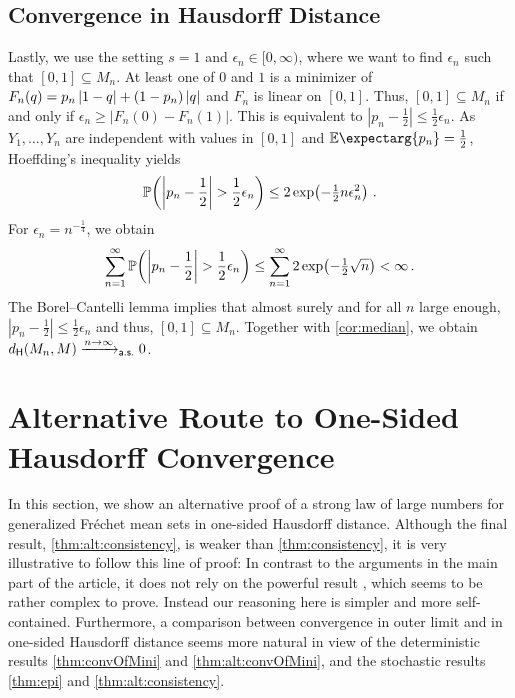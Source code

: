 \documentclass{scrartcl}
\renewcommand{\subset}{\subseteq}
\newcommand{\PrOf}[1]{\Pr\mathopen{}\lb #1 \rb\mathclose{}}
\newcommand{\Ex}{\E\expectarg}
\newcommand*{\ms}[1]{\mathsf{#1}}
\newcommand{\equationFullstop}{\, .}
\newcommand{\eqfs}{\equationFullstop}
\theoremstyle{plain}\newtheorem{theorem}{Theorem}[section]
\theoremstyle{definition}
\theoremstyle{remark}
\begin{document}
\begin{appendix}
\subsection{Convergence in Hausdorff Distance}
Lastly, we use the setting $s=1$ and $\epsilon_n\in[0,\infty)$, where we want to find $\epsilon_n$ such that $[0,1] \subset M_n$.
At least one of $0$ and $1$ is a minimizer of $F_n(q)=p_n\left| 1-q \right|+(1-p_n)\left| q \right|$ and $F_n$ is linear on $[0,1]$. Thus, $[0,1] \subset M_n$ if and only if  $\epsilon_n \geq |F_n(0)-F_n(1)|$. This is equivalent to
 $|p_n-\frac12| \leq \frac12\epsilon_n$.
As $Y_1,\dots, Y_n$ are independent with values in $[0,1]$ and $\Ex{p_n} = \frac12$, Hoeffding's inequality \cite[Theorem 2]{hoeffding63} yields
\begin{equation*}
	\PrOf{\abs{p_n-\frac12} > \frac12\epsilon_n} \leq 2 \exp\brOf{-\tfrac12 n \epsilon_n^2}
	\eqfs
\end{equation*}
For $\epsilon_n = n^{-\frac14}$, we obtain
\begin{equation*}
	\sum_{n=1}^\infty \PrOf{\abs{p_n-\frac12} > \frac12\epsilon_n}  \leq \sum_{n=1}^\infty 2\exp\brOf{-\tfrac12 \sqrt n} < \infty
	\eqfs
\end{equation*}
The Borel--Cantelli lemma implies that almost surely and for all $n$ large enough,  $|p_n-\frac12| \leq \frac12\epsilon_n$ and thus, $[0,1] \subset M_n$. 
Together with \autoref{cor:median}, we obtain $d_{\Hausdorff}(M_n, M) \xrightarrow{n\to\infty}_{\ms{a.s.}} 0$.
 \section{Alternative Route to One-Sided Hausdorff Convergence}\label{sec:alt}
In this section, we show an alternative proof of a strong law of large numbers for generalized Fréchet mean sets in one-sided Hausdorff distance. Although the final result, \autoref{thm:alt:consistency}, is weaker than \autoref{thm:consistency}, it is very illustrative to follow this line of proof:
In contrast to the arguments in the main part of the article, it does not rely on the powerful result \cite[Theorem 1.1]{korf01}, which seems to be rather complex to prove. Instead our reasoning here is simpler and more self-contained.
Furthermore, a comparison between convergence in outer limit and in one-sided Hausdorff distance seems more natural in view of the deterministic results \autoref{thm:convOfMini} and \autoref{thm:alt:convOfMini}, and the stochastic results \autoref{thm:epi} and \autoref{thm:alt:consistency}.

\end{appendix}
\end{document}
